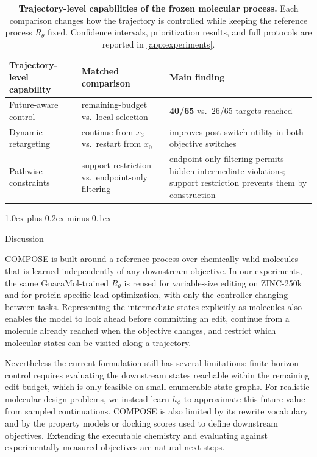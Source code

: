 \documentclass{article}
\makeatletter
\theoremstyle{definition}
\theoremstyle{remark}
\def\section{\@startsection{section}{1}{\z@}{-1.4ex plus -0.4ex minus -.2ex}%
  {1.0ex plus 0.2ex minus 0.1ex}{\large\sc\raggedright}}
\makeatother
\begin{document}
\begin{table}[t]
\centering\small\setlength{\tabcolsep}{6pt}
\begin{tabular}{@{}p{} p{} p{}@{}}
\toprule
Trajectory-level capability & Matched comparison & Main finding \\
\midrule
Future-aware control & remaining-budget vs.\ local selection
  & \textbf{40/65} vs.\ 26/65 targets reached \\
\addlinespace[2pt]
Dynamic retargeting & continue from $x_3$ vs.\ restart from $x_0$
  & improves post-switch utility in both objective switches \\
\addlinespace[2pt]
Pathwise constraints & support restriction vs.\ endpoint-only filtering
  & endpoint-only filtering permits hidden intermediate violations; support
    restriction prevents them by construction \\
\bottomrule
\end{tabular}
\caption{\small\textbf{Trajectory-level capabilities of the frozen molecular
process.} Each comparison changes how the trajectory is controlled while keeping
the reference process $R_\theta$ fixed. Confidence intervals, prioritization
results, and full protocols are reported in \cref{app:experiments}.}
\label{tab:mechanism}%
\label{fig:mechanism}
\end{table}

\section{Discussion}
\label{sec:discussion}

COMPOSE is built around a reference process over chemically valid molecules that is learned independently of any
downstream objective. In our experiments, the same GuacaMol-trained $R_\theta$ is
reused for variable-size editing on ZINC-250k and for protein-specific lead
optimization, with only the controller changing between tasks. Representing the
intermediate states explicitly as molecules also enables the model to look ahead
before committing an edit, continue from a molecule already reached when the
objective changes, and restrict which molecular states can be visited along a
trajectory.

Nevertheless the current formulation still has several limitations: finite-horizon control requires evaluating the downstream states reachable within the remaining edit budget, which is only feasible on small enumerable state graphs. For realistic molecular design problems, we instead learn $h_\phi$ to approximate this future value from sampled continuations. COMPOSE is also limited by its rewrite vocabulary and by the property models or docking scores used to define downstream objectives. Extending the executable chemistry and evaluating against experimentally measured objectives are natural next steps.
\end{document}
